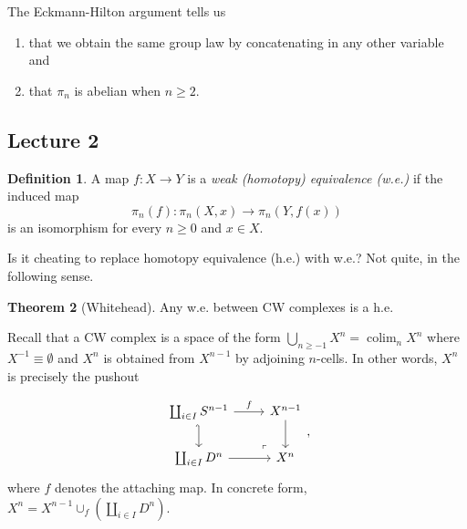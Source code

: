 \documentclass[10pt,letterpaper,cm]{nupset}
\theoremstyle{definition}
\newtheorem{defn}{Definition}[subsection]
\theoremstyle{theorem}
\newtheorem{theorem}[defn]{Theorem}
\theoremstyle{remark}
\newcommand{\1}{\mathbb{1}}
\newcommand{\0}{\vec 0}
\DeclareMathOperator{\colim}{colim}
\newcommand{\be}{\begin{enumerate}}
\newcommand{\ee}{\end{enumerate}}
\begin{document}
The Eckmann-Hilton argument tells us
\be
\item that we obtain the same group law by concatenating in any other variable and
\item that $\pi_n$ is abelian when $n\geq 2$.
\ee


\subsection{Lecture 2}

\begin{defn}
A map $f: X \to Y$ is a \textit{weak \emph{(}homotopy\emph{)} equivalence \emph{(}w.e.\emph{)}} if  the induced map
\[
\pi_n(f) : \pi_n(X,x) \to \pi_n(Y,f(x))
\] is an isomorphism for every $n \geq 0$ and $x\in X$.
\end{defn}

Is it cheating to replace homotopy equivalence (h.e.) with w.e.? Not quite, in the following sense.

\begin{theorem}[Whitehead]\label{Whitehead}
Any w.e. between CW complexes is a h.e.
\end{theorem}

Recall that a CW complex is a space of the form $\bigcup_{n\geq {-1}}X^n = \colim_n{X^n}$ where $X^{-1} \equiv \emptyset$ and $X^n$ is obtained from $X^{n-1}$ by adjoining $n$-cells. In other words, $X^n$ is precisely the pushout

\[
\begin{tikzcd}
	{\coprod_{i\in I}S^{n-1}} & {X^{n-1}} \\
	{\coprod_{i\in I}D^n} & {X^n}
	\arrow["\lrcorner"{anchor=center, pos=0.125, rotate=180}, draw=none, from=2-2, to=1-1]
	\arrow[hook', from=1-1, to=2-1]
	\arrow["f", from=1-1, to=1-2]
	\arrow[from=1-2, to=2-2]
	\arrow[from=2-1, to=2-2]
\end{tikzcd},
\] where $f$ denotes the attaching map. In concrete form, $X^n = X^{n-1} \cup_f \left(\coprod_{i\in I}D^n\right)$.
\end{document}
